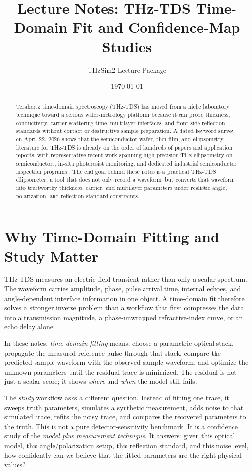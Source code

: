 \documentclass[11pt]{article}
\title{Lecture Notes: THz-TDS Time-Domain Fit and Confidence-Map Studies}
\author{THzSim2 Lecture Package}
\date{\today}
\begin{document}
\maketitle

\begin{abstract}
Terahertz time-domain spectroscopy (THz-TDS) has moved from a niche laboratory technique toward a serious wafer-metrology platform because it can probe thickness, conductivity, carrier scattering time, multilayer interfaces, and front-side reflection standards without contact or destructive sample preparation. A dated keyword survey on April 22, 2026 shows that the semiconductor-wafer, thin-film, and ellipsometry literature for THz-TDS is already on the order of hundreds of papers and application reports, with representative recent work spanning high-precision THz ellipsometry on semiconductors, in-situ photoresist monitoring, and dedicated industrial semiconductor inspection programs \cite{ellipsometry_intro,gan_ellipsometry,photoresist_2025,fraunhofer_semicon}. The end goal behind these notes is a practical THz-TDS ellipsometer: a tool that does not only record a waveform, but converts that waveform into trustworthy thickness, carrier, and multilayer parameters under realistic angle, polarization, and reflection-standard constraints.
\end{abstract}

\section{Why Time-Domain Fitting and Study Matter}
THz-TDS measures an electric-field transient rather than only a scalar spectrum. The waveform carries amplitude, phase, pulse arrival time, internal echoes, and angle-dependent interface information in one object. A time-domain fit therefore solves a stronger inverse problem than a workflow that first compresses the data into a transmission magnitude, a phase-unwrapped refractive-index curve, or an echo delay alone.

In these notes, \emph{time-domain fitting} means: choose a parametric optical stack, propagate the measured reference pulse through that stack, compare the predicted sample waveform with the observed sample waveform, and optimize the unknown parameters until the residual trace is minimized. The residual is not just a scalar score; it shows \emph{where} and \emph{when} the model still fails.

The \emph{study} workflow asks a different question. Instead of fitting one trace, it sweeps truth parameters, simulates a synthetic measurement, adds noise to that simulated trace, refits the noisy trace, and compares the recovered parameters to the truth. This is not a pure detector-sensitivity benchmark. It is a confidence study of the \emph{model plus measurement technique}. It answers: given this optical model, this angle/polarization setup, this reflection standard, and this noise level, how confidently can we believe that the fitted parameters are the right physical values?
\end{document}
